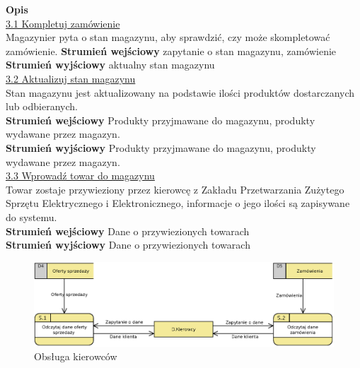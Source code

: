 	\textbf{Opis} \\
	\underline{3.1 Kompletuj zamówienie}\\
	Magazynier pyta o stan magazynu, aby sprawdzić, czy może skompletować zamówienie.
	\textbf{Strumień wejściowy} zapytanie o stan magazynu, zamówienie\\
	\textbf{Strumień wyjściowy} aktualny stan magazynu\\

	\underline{3.2 Aktualizuj stan magazynu}\\ 
	Stan magazynu jest aktualizowany na podstawie ilości produktów dostarczanych lub odbieranych.\\	
	\textbf{Strumień wejściowy} Produkty przyjmawane do magazynu, produkty wydawane przez magazyn.\\
	\textbf{Strumień wyjściowy} Produkty przyjmawane do magazynu, produkty wydawane przez magazyn.\\
	
	\underline{3.3 Wprowadź towar do magazynu}\\
	Towar zostaje przywieziony przez kierowcę z Zakładu Przetwarzania Zużytego Sprzętu Elektrycznego i Elektronicznego, informacje o jego ilości są zapisywane do systemu.\\
	\textbf{Strumień wejściowy} Dane o przywiezionych towarach\\
	\textbf{Strumień wyjściowy} Dane o przywiezionych towarach

	\begin{figure}[H]
		\centering
		\centerline{\includegraphics[width=1.1\textwidth]{img/DFD/2-level-kierowcy.eps}}
		\caption{Obsługa kierowców}
	\end{figure}
